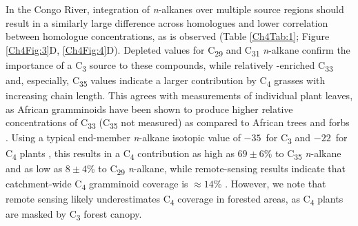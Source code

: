 In the Congo River, integration of \textit{n}-alkanes over multiple source regions should result in a similarly large  difference across homologues and lower correlation between homologue concentrations, as is observed (Table \ref{Ch4Tab:1}; Figure \ref{Ch4Fig:3}D, \ref{Ch4Fig:4}D). Depleted  values for C\textsubscript{29} and C\textsubscript{31} \textit{n}-alkane confirm the importance of a C\textsubscript{3} source to these compounds, while relatively -enriched C\textsubscript{33} and, especially, C\textsubscript{35} values indicate a larger contribution by C\textsubscript{4} grasses with increasing chain length. This agrees with measurements of individual plant leaves, as African gramminoids have been shown to produce higher relative concentrations of C\textsubscript{33} (C\textsubscript{35} not measured) as compared to African trees and forbs \citep{Rommerskirchen:2006gr,Vogts:2009fb}. Using a typical end-member \textit{n}-alkane isotopic value of $-35$\textperthousand\ for C\textsubscript{3} and $-22$\textperthousand\ for C\textsubscript{4} plants \citep[\textit{e.g.}][]{Castaneda:2011jb}, this results in a C\textsubscript{4} contribution as high as $69 \pm 6$\% to C\textsubscript{35} \textit{n}-alkane and as low as $8 \pm 4$\% to C\textsubscript{29} \textit{n}-alkane, while remote-sensing results indicate that catchment-wide C\textsubscript{4} gramminoid coverage is $\approx 14$\% \citep[Figure \ref{Ch4Fig:1}B;][]{Still:2010wh}. However, we note that remote sensing likely underestimates C\textsubscript{4} coverage in forested areas, as C\textsubscript{4} plants are masked by C\textsubscript{3} forest canopy.

